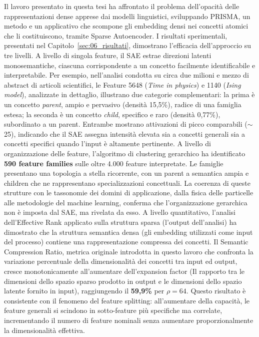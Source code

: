 Il lavoro presentato in questa tesi ha affrontato il problema dell'opacità delle rappresentazioni dense apprese dai modelli linguistici, sviluppando PRISMA, un metodo e un applicativo che scompone gli embedding densi nei concetti atomici che li costituiscono, tramite Sparse Autoencoder.
I risultati sperimentali, presentati nel Capitolo~\ref{sec:06_risultati}, dimostrano l'efficacia dell'approccio su tre livelli.
A livello di singola feature, il SAE estrae direzioni latenti monosemantiche, ciascuna corrispondente a un concetto facilmente identificabile e interpretabile. Per esempio, nell'analisi condotta su circa due milioni e mezzo di abstract di articoli scientifici, le Feature 5648 (\textit{Time in physics}) e 1140 (\textit{Ising model}), analizzate in dettaglio, illustrano due categorie complementari: la prima è un concetto \textit{parent}, ampio e pervasivo (densità 15,5\%), radice di una famiglia estesa; la seconda è un concetto \textit{child}, specifico e raro (densità 0,77\%), subordinato a un parent. Entrambe mostrano attivazioni di picco comparabili ($\sim$25), indicando che il SAE assegna intensità elevata sia a concetti generali sia a concetti specifici quando l'input è altamente pertinente.
A livello di organizzazione delle feature, l'algoritmo di clustering gerarchico ha identificato \textbf{590 feature families} sulle oltre 4.000 feature interpretate. Le famiglie presentano una topologia a stella ricorrente, con un parent a semantica ampia e children che ne rappresentano specializzazioni concettuali. La coerenza di queste strutture con le tassonomie dei domini di applicazione, dalla fisica delle particelle alle metodologie del machine learning, conferma che l'organizzazione gerarchica non è imposta dal SAE, ma rivelata da esso.
A livello quantitativo, l'analisi dell'Effective Rank applicato sulla struttura sparsa (l'output dell'analisi) ha dimostrato che la struttura semantica densa (gli embedding utilizzati come input del processo) contiene una rappresentazione compressa dei concetti. Il Semantic Compression Ratio, metrica originale introdotta in questo lavoro che confronta la variazione percentuale della dimensionalità dei concetti tra input ed output, cresce monotonicamente all'aumentare dell'expansion factor (Il rapporto tra le dimensioni dello spazio sparso prodotto in output e le dimensioni dello spazio latente fornito in input), raggiungendo il \textbf{59,9\%} per $\rho = 64$. Questo risultato è consistente con il fenomeno del feature splitting: all'aumentare della capacità, le feature generali si scindono in sotto-feature più specifiche ma correlate, incrementando il numero di feature nominali senza aumentare proporzionalmente la dimensionalità effettiva.
